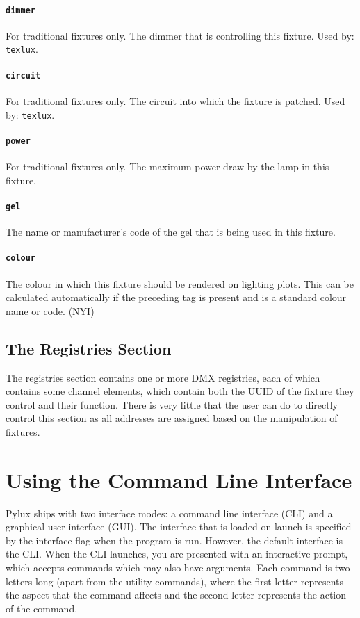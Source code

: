 \documentclass[a4paper]{article}
\begin{document}
\paragraph{\texttt{dimmer}}
For traditional fixtures only. The dimmer that is controlling this fixture. 
Used by: \texttt{texlux}.

\paragraph{\texttt{circuit}}
For traditional fixtures only. The circuit into which the fixture is patched. 
Used by: \texttt{texlux}.

\paragraph{\texttt{power}}
For traditional fixtures only. The maximum power draw by the lamp in this 
fixture.

\paragraph{\texttt{gel}}
The name or manufacturer's code of the gel that is being used in this 
fixture.

\paragraph{\texttt{colour}}
The colour in which this fixture should be rendered on lighting plots. This 
can be calculated automatically if the preceding tag is present and is a 
standard colour name or code. (NYI)

\subsection{The Registries Section}
The registries section contains one or more DMX registries, each of which 
contains some channel elements, which contain both the UUID of the fixture 
they control and their function. There is very little that the user can do 
to directly control this section as all addresses are assigned based on 
the manipulation of fixtures.

\section{Using the Command Line Interface}
Pylux ships with two interface modes: a command line interface (CLI) and a 
graphical user interface (GUI). The interface that is loaded on launch is 
specified by the interface flag when the program is run. However, the 
default interface is the CLI. When the CLI launches, you are presented with an 
interactive prompt, which accepts commands which may also have arguments. Each 
command is two letters long (apart from the utility commands), where the first 
letter represents the aspect that the command affects and the second letter 
represents the action of the command.
\end{document}
